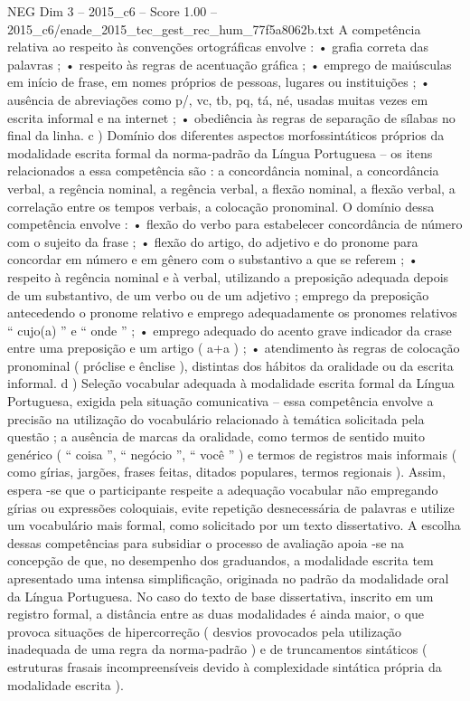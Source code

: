 \begin{textsample}{NEG Dim 3 – 2015\_c6 – Score 1.00 – 2015\_c6/enade\_2015\_tec\_gest\_rec\_hum\_77f5a8062b.txt}
A competência relativa ao respeito às convenções ortográficas envolve : • grafia correta das palavras ; • respeito às regras de acentuação gráfica ; • emprego de maiúsculas em início de frase, em nomes próprios de pessoas, lugares ou instituições ; • ausência de abreviações como p/, vc, tb, pq, tá, né, usadas muitas vezes em escrita informal e na internet ; • obediência às regras de separação de sílabas no final da linha. c ) Domínio dos diferentes aspectos morfossintáticos próprios da modalidade escrita formal da norma-padrão da Língua Portuguesa – os itens relacionados a essa competência são : a concordância nominal, a concordância verbal, a regência nominal, a regência verbal, a flexão nominal, a flexão verbal, a correlação entre os tempos verbais, a colocação pronominal.
O domínio dessa competência envolve : • flexão do verbo para estabelecer concordância de número com o sujeito da frase ; • flexão do artigo, do adjetivo e do pronome para concordar em número e em gênero com o substantivo a que se referem ; • respeito à regência nominal e à verbal, utilizando a preposição adequada depois de um substantivo, de um verbo ou de um adjetivo ; emprego da preposição antecedendo o pronome relativo e emprego adequadamente os pronomes relativos “ cujo(a) ” e “ onde ” ; • emprego adequado do acento grave indicador da crase entre uma preposição e um artigo ( a+a ) ; • atendimento às regras de colocação pronominal ( próclise e ênclise ), distintas dos hábitos da oralidade ou da escrita informal. d ) Seleção vocabular adequada à modalidade escrita formal da Língua Portuguesa, exigida pela situação comunicativa – essa competência envolve a precisão na utilização do vocabulário relacionado à temática solicitada pela questão ; a ausência de marcas da oralidade, como termos de sentido muito genérico ( “ coisa ”, “ negócio ”, “ você ” ) e termos de registros mais informais ( como gírias, jargões, frases feitas, ditados populares, termos regionais ).
Assim, espera -se que o participante respeite a adequação vocabular não empregando gírias ou expressões coloquiais, evite repetição desnecessária de palavras e utilize um vocabulário mais formal, como solicitado por um texto dissertativo.
A escolha dessas competências para subsidiar o processo de avaliação apoia -se na concepção de que, no desempenho dos graduandos, a modalidade escrita tem apresentado uma intensa simplificação, originada no padrão da modalidade oral da Língua Portuguesa.
No caso do texto de base dissertativa, inscrito em um registro formal, a distância entre as duas modalidades é ainda maior, o que provoca situações de hipercorreção ( desvios provocados pela utilização inadequada de uma regra da norma-padrão ) e de truncamentos sintáticos ( estruturas frasais incompreensíveis devido à complexidade sintática própria da modalidade escrita ).

\end{textsample}

